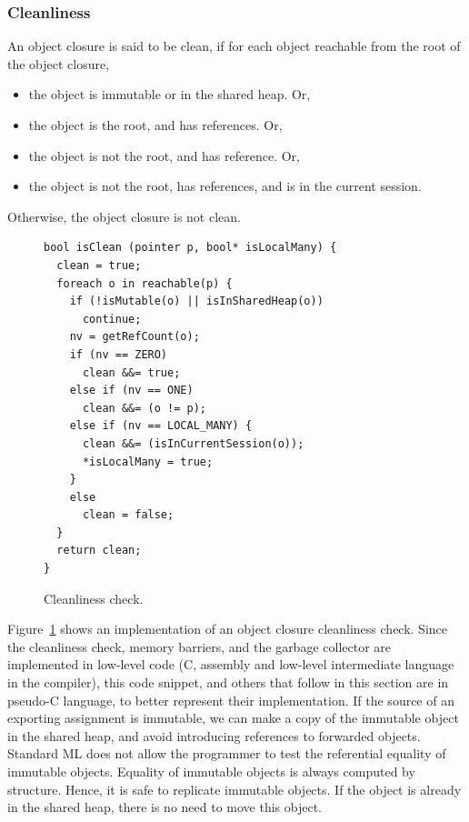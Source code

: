 \subsubsection{Cleanliness}

An object closure is said to be clean, if for each object reachable from the
root of the object closure,

\begin{itemize}
\item the object is immutable or in the shared heap. Or,
\item the object is the root, and has  references. Or,
\item the object is not the root, and has  reference. Or,
\item the object is not the root, has  references, and is in the
current session.
\end{itemize}

\noindent Otherwise, the object closure is not clean.

\begin{figure}
\begin{lstlisting}
bool isClean (pointer p, bool* isLocalMany) {
  clean = true;
  foreach o in reachable(p) {
    if (!isMutable(o) || isInSharedHeap(o))
      continue;
    nv = getRefCount(o);
    if (nv == ZERO)
      clean &&= true;
    else if (nv == ONE)
      clean &&= (o != p);
    else if (nv == LOCAL_MANY) {
      clean &&= (isInCurrentSession(o));
      *isLocalMany = true;
    }
    else
      clean = false;
  }
  return clean;
}
\end{lstlisting}
\caption{Cleanliness check.}
\label{code:cleanliness}
\end{figure}

Figure~\ref{code:cleanliness} shows an implementation of an object closure
cleanliness check. Since the cleanliness check, memory barriers, and the
garbage collector are implemented in low-level code (C, assembly and low-level
intermediate language in the compiler), this code snippet, and others that
follow in this section are in pseudo-C language, to better represent their
implementation. If the source of an exporting assignment is immutable, we can
make a copy of the immutable object in the shared heap, and avoid introducing
references to forwarded objects. Standard ML does not allow the programmer to
test the referential equality of immutable objects. Equality of immutable
objects is always computed by structure. Hence, it is safe to replicate
immutable objects. If the object is already in the shared heap, there is no
need to move this object.

